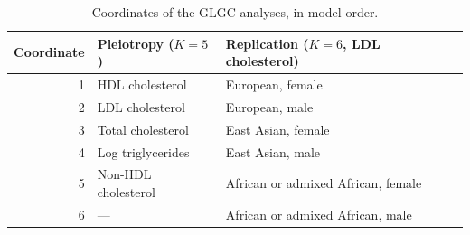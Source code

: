 \begin{table}[htbp]
\centering
\caption{Coordinates of the GLGC analyses, in model order.}
\label{sup:tab:glgc-coordinates}
\small
\begin{tabular}{rll}
\toprule
Coordinate & Pleiotropy ($K=5$) & Replication ($K=6$, LDL cholesterol)\\
\midrule
1 & HDL cholesterol & European, female\\
2 & LDL cholesterol & European, male\\
3 & Total cholesterol & East Asian, female\\
4 & Log triglycerides & East Asian, male\\
5 & Non-HDL cholesterol & African or admixed African, female\\
6 & --- & African or admixed African, male\\
\bottomrule
\end{tabular}
\end{table}
